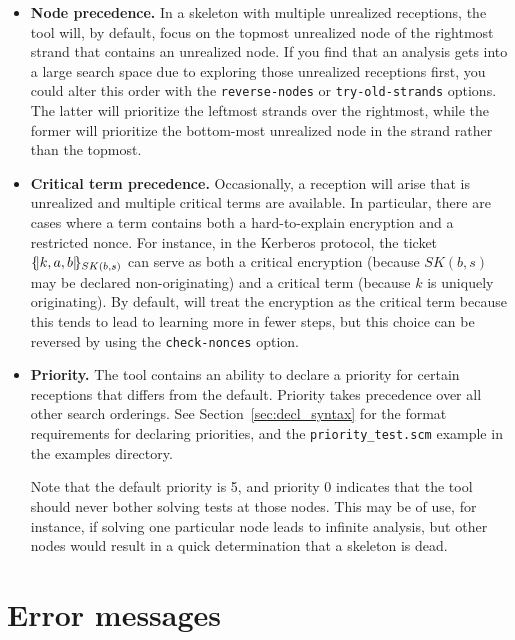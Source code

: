 \begin{itemize}
\item {\bf Node precedence.}  In a skeleton with multiple unrealized
  receptions, the tool will, by default, focus on the topmost
  unrealized node of the rightmost strand that contains an unrealized
  node.  If you find that an analysis gets into a large search space
  due to exploring those unrealized receptions first, you could alter
  this order with the \texttt{reverse-nodes} or
  \texttt{try-old-strands} options.  The latter will prioritize the
  leftmost strands over the rightmost, while the former will
  prioritize the bottom-most unrealized node in the strand rather than
  the topmost.

\item {\bf Critical term precedence.}  Occasionally, a reception will
  arise that is unrealized and multiple critical terms are available.
  In particular, there are cases where a term contains both a
  hard-to-explain encryption and a restricted nonce.  For instance, in
  the Kerberos protocol, the ticket $\{\!|k,a,b|\!\}_{SK(b,s)}$ can serve
  as both a critical encryption (because $SK(b,s)$ may be declared
  non-originating) and a critical term (because $k$ is uniquely
  originating).  By default, {\cpsa} will treat the encryption as the
  critical term because this tends to lead to learning more in fewer
  steps, but this choice can be reversed by using the
  \texttt{check-nonces} option.

\item {\bf Priority.}  The tool contains an ability to declare a
  priority for certain receptions that differs from the default.
  Priority takes precedence over all other search orderings.  See
  Section~\ref{sec:decl_syntax} for the format requirements for
  declaring priorities, and the \texttt{priority\_test.scm} example in the
  examples directory.

  Note that the default priority is 5, and priority 0 indicates that
  the tool should never bother solving tests at those nodes.  This may
  be of use, for instance, if solving one particular node leads to
  infinite analysis, but other nodes would result in a quick
  determination that a skeleton is dead.
\end{itemize}

\section{Error messages}
\label{sec:errors}

